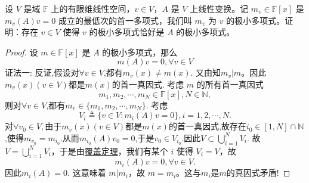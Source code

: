 \documentclass[../../main.tex]{subfiles}
\begin{document}
\begin{example}
设 \( V \) 是域 \( \mathbb{F} \) 上的有限维线性空间，\( v \in V \)，\( A \) 是 \( V \) 上线性变换。记 \( m_v \in \mathbb{F}[x] \) 是 \( m_v(A)v = 0 \) 成立的最低次的首一多项式，我们叫 \( m_v \) 为 \( v \) 的极小多项式。证明：存在 \( v \in V \) 使得 \( v \) 的极小多项式恰好是 \( A \) 的极小多项式。
\end{example}
\begin{proof}
设 \( m \in \mathbb{F}[x] \) 是 \( A \) 的极小多项式，那么
\[
m(A)v = 0, \forall v \in V
\]
{\color{blue}证法一:}
反证,假设对$\forall v\in V$,都有$m_v(x)\ne m(x)$.
又由知\( m_v|m \)。因此$m_v(x)(v\in V)$都是$m(x)$的首一真因式.
考虑 \( m \) 的所有首一真因式
\[
m_1, m_2, \cdots, m_N \in \mathbb{F}[x],N\in\mathbb{N},
\]
则对$\forall v\in V$,都有$m_v\in \{m_1,m_2,\cdots,m_N\}$.
考虑
\[
V_i \triangleq \{ v \in V : m_i(A)v = 0 \}, i = 1, 2, \cdots, N.
\]
对$\forall v_0\in V,$由于$m_v(x)(v\in V)$都是$m(x)$的首一真因式,故存在$i_0\in [1,N]\cap \mathbb{N}$,使得$m_{v_0}=m_{i_0}$.从而$m_{i_0}(A)v_0=0$,于是$v_0\in V_{i_0}.$因此$V\subset \bigcup_{i=1}^N V_i.$
故\( V = \bigcup_{i=1}^N V_i \)，于是由\hyperref[theorem:覆盖定理]{覆盖定理}，我们有某个 \( i \) 使得 \( V_i = V \)，故$$m_i(A)v=0,\forall v\in V.$$
因此$m_i(A)=0.$
这意味着 \( m | m_i \)，故 \( m = m_i\)。这与$m_i$是$m$的真因式矛盾!
\end{proof}
\end{document}
